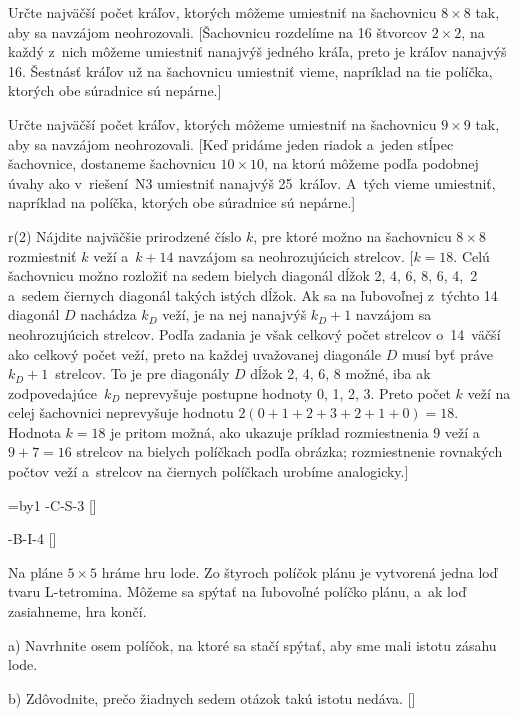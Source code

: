 {Určte najväčší počet kráľov, ktorých môžeme umiestniť na šachovnicu
$8\times8$ tak, aby sa navzájom neohrozovali. [Šachovnicu rozdelíme na
16 štvorcov $2\times2$, na každý z~nich môžeme umiestniť nanajvýš jedného
kráľa, preto je kráľov nanajvýš 16. Šestnásť kráľov už na šachovnicu
umiestniť vieme, napríklad na tie políčka, ktorých obe súradnice sú nepárne.]

Určte najväčší počet kráľov, ktorých môžeme umiestniť na šachovnicu
$9\times9$ tak, aby sa navzájom neohrozovali. [Keď pridáme jeden riadok
a~jeden stĺpec šachovnice, dostaneme šachovnicu $10\times10$, na ktorú
môžeme podľa podobnej úvahy ako v~riešení~N3 umiestniť
nanajvýš 25~kráľov. A~tých vieme
umiestniť, napríklad na políčka, ktorých obe súradnice sú nepárne.]

\D
\inspicture r(2)
Nájdite najväčšie prirodzené číslo $k$, pre ktoré možno na šachovnicu $8\times8$
rozmiestniť $k$ veží a~$k+14$ navzájom sa neohrozujúcich strelcov.
[$k=18$. Celú šachovnicu možno rozložiť na sedem bielych diagonál dĺžok 2,
4, 6, 8, 6, 4,~2 a~sedem čiernych diagonál takých istých dĺžok. Ak sa na
ľubovoľnej z~týchto 14 diagonál $D$ nachádza $k_D$ veží, je na nej nanajvýš
$k_D+1$ navzájom sa neohrozujúcich strelcov. Podľa zadania je však
celkový počet strelcov o~14~väčší ako celkový počet veží, preto na každej
uvažovanej diagonále $D$ musí byť práve $k_D+1$~strelcov. To je pre
diagonály $D$ dĺžok 2, 4, 6, 8 možné, iba ak zodpovedajúce~$k_D$
neprevyšuje postupne hodnoty 0, 1, 2, 3. Preto počet $k$ veží na celej
šachovnici neprevyšuje hodnotu $2(0+1+2+3+2+1+0)=18$. Hodnota $k=18$ je
pritom možná, ako ukazuje príklad rozmiestnenia 9 veží a~$9+7=16$ strelcov
na bielych políčkach podľa obrázka; rozmiestnenie rovnakých počtov veží
a~strelcov na čiernych políčkach urobíme analogicky.]

\everypar={\advance\nom by1 }
-C-S-3
[]

-B-I-4
[]

Na pláne $5\times 5$ hráme hru lode. Zo štyroch políčok plánu je vytvorená jedna loď
tvaru L-tetromina. Môžeme sa spýtať na ľubovoľné políčko plánu, a~ak loď zasiahneme, hra končí.
\item{a)} Navrhnite osem políčok, na ktoré sa stačí spýtať, aby sme mali
        istotu zásahu lode.
\item{b)} Zdôvodnite, prečo žiadnych sedem otázok takú istotu nedáva.
        []

}
